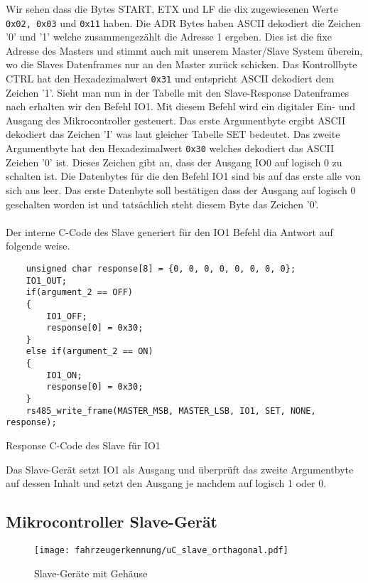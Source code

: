 Wir sehen dass die Bytes START, ETX und LF die dix zugewiesenen Werte \texttt{0x02, 0x03} und \texttt{0x11} haben. Die ADR Bytes haben ASCII dekodiert die Zeichen '0' und '1' welche zusammengezählt die Adresse 1 ergeben. 
Dies ist die fixe Adresse des Masters und stimmt auch mit unserem Master/Slave System überein, wo die Slaves Datenframes nur an den Master zurück schicken. Das Kontrollbyte CTRL hat den Hexadezimalwert \texttt{0x31} 
und entspricht ASCII dekodiert dem Zeichen '1'. Sieht man nun in der Tabelle mit den Slave-Response Datenframes nach erhalten wir den Befehl IO1. Mit diesem Befehl wird ein digitaler Ein- und Ausgang des Mikrocontroller gesteuert.
Das erste Argumentbyte ergibt ASCII dekodiert das Zeichen 'I' was laut gleicher Tabelle SET bedeutet. Das zweite Argumentbyte hat den Hexadezimalwert \texttt{0x30} welches dekodiert das ASCII Zeichen '0' ist. Dieses Zeichen gibt an,
dass der Ausgang IO0 auf logisch 0 zu schalten ist. Die Datenbytes für die den Befehl IO1 sind bis auf das erste alle von sich aus leer. Das erste Datenbyte soll bestätigen dass der Ausgang auf logisch 0 geschalten worden ist und tatsächlich steht 
diesem Byte das Zeichen '0'.  
\\ \\
Der interne C-Code des Slave generiert für den IO1 Befehl dia Antwort auf folgende weise.
\begin{listing}[H]
    \begin{verbatim}
    unsigned char response[8] = {0, 0, 0, 0, 0, 0, 0, 0};
    IO1_OUT;
    if(argument_2 == OFF)
    {
        IO1_OFF; 
        response[0] = 0x30;
    }
    else if(argument_2 == ON)
    {
        IO1_ON;
        response[0] = 0x30;
    }
    rs485_write_frame(MASTER_MSB, MASTER_LSB, IO1, SET, NONE, response);
    \end{verbatim}
    \caption{Response C-Code des Slave für IO1}
  \end{listing}

Das Slave-Gerät setzt IO1 als Ausgang und überprüft das zweite Argumentbyte auf dessen Inhalt und setzt den Ausgang je nachdem auf logisch 1 oder 0.
\pagebreak
\subsection{Mikrocontroller Slave-Gerät}

\begin{figure}[H]
    \centering
    \texttt{[image: fahrzeugerkennung/uC\_slave\_orthagonal.pdf]}
    \caption{Slave-Geräte mit Gehäuse}
\end{figure}

